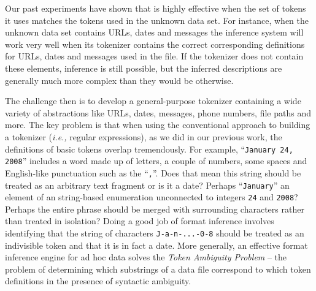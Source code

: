 Our past experiments \cite{fisher+:dirttoshovels} have shown that \learnpads{} is highly effective
when the set of tokens it uses matches the tokens used in the unknown
data set.  For instance, when the unknown data set contains 
URLs, dates and messages the inference system will work very well when
its tokenizer contains the correct corresponding definitions
for URLs, dates and messages used in the file.  If the
tokenizer does not contain these elements, inference is still possible,
but the inferred descriptions are generally much more complex
than they would be otherwise. 

The challenge then is to develop a general-purpose tokenizer containing
a wide variety of abstractions like URLs, dates, messages,
phone numbers, file paths and more.  The key problem is that
when using the conventional approach 
to building a tokenizer ({\em i.e.,} regular expressions), as we did
in our previous work, the definitions of basic tokens overlap
tremendously.  For example, 
``{\tt January 24, 2008}'' includes a word made up of letters, a couple 
of numbers,
some spaces and English-like punctuation such as the ``{\tt ,}''.  Does that mean 
this string should be treated as an arbitrary text fragment or 
is it a date? Perhaps ``{\tt January}'' an element of an string-based enumeration 
unconnected to integers {\tt 24} and {\tt 2008}?  Perhaps the entire phrase
should be merged with surrounding characters rather than treated
in isolation?  Doing a good job of format
inference involves identifying that the string of characters
{\tt J-a-n-...-0-8} should be treated as an indivisible token and that it is
in fact a date.  More generally, an effective format inference engine
for ad hoc data solves the {\em Token Ambiguity Problem}
-- the problem of determining which substrings of a data file correspond
to which token definitions in the presence of syntactic 
ambiguity.

